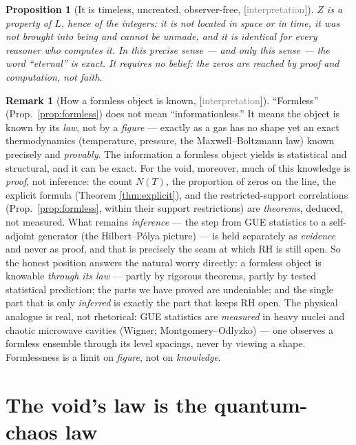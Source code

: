 \documentclass[11pt,a4paper]{article}
\newtheorem{proposition}[theorem]{Proposition}
\theoremstyle{definition}
\newtheorem{remark}[theorem]{Remark}
\newcommand{\TAGphil}{{\small\textsf{[\textcolor{gray}{interpretation}]}}}
\begin{document}
\begin{proposition}[It is timeless, uncreated, observer-free, \TAGphil]\label{prop:eternal}
$Z$ is a property of $L$, hence of the integers: it is not located in space or
in time, it was not brought into being and cannot be unmade, and it is
identical for every reasoner who computes it. In this precise sense --- and
\emph{only} this sense --- the word ``eternal'' is exact. It requires no belief:
the zeros are reached by proof and computation, not faith.
\end{proposition}

\begin{remark}[How a formless object is known, \TAGphil]\label{rem:knowing}
``Formless'' (Prop.\ \ref{prop:formless}) does not mean
``informationless.'' It means the object is known by its \emph{law}, not by
a \emph{figure} --- exactly as a gas has no shape yet an exact
thermodynamics (temperature, pressure, the Maxwell--Boltzmann law) known
precisely and \emph{provably}. The information a formless object yields is
statistical and structural, and it can be exact. For the void, moreover, much
of this knowledge is \emph{proof}, not inference: the count $N(T)$, the
proportion of zeros on the line, the explicit formula (Theorem
\ref{thm:explicit}), and the restricted-support correlations (Prop.\
\ref{prop:formless}, within their support restrictions) are \emph{theorems},
deduced, not measured. What remains \emph{inference} --- the step from GUE
statistics to a self-adjoint generator (the Hilbert--Pólya picture) --- is held
separately as \emph{evidence} and never as proof, and that is precisely the
seam at which RH is still open. So the honest position answers the natural
worry directly: a formless object is knowable \emph{through its law} --- partly
by rigorous theorems, partly by tested statistical prediction; the parts we
have proved are undeniable; and the single part that is only \emph{inferred} is
exactly the part that keeps RH open. The physical analogue is real, not rhetorical: GUE statistics are
\emph{measured} in heavy nuclei and chaotic microwave cavities (Wigner;
Montgomery--Odlyzko) --- one observes a formless ensemble through its level
spacings, never by viewing a shape. Formlessness is a limit on \emph{figure},
not on \emph{knowledge}.
\end{remark}

\section{The void's law is the quantum-chaos law}\label{sec:quantum}
\end{document}
